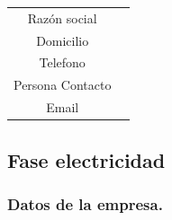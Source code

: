 \documentclass[../main]{subfiles}
\newcounter{z}
\begin{document}
{\begin{table}[h!]
    \centering
    \begin{tabular}{|c|c|} \hline
        Razón social &  \\
        Domicilio & \\
        Telefono & \\
        Persona Contacto & \\
        Email & \\
        
    \end{tabular}
\end{table}

\subsection{Fase electricidad}
\subsubsection{Datos de la empresa.}
}
\end{document}
